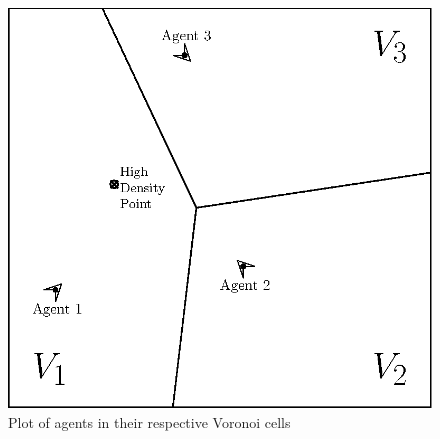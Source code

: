 \begin{figure} [H]
    \centering
    \includegraphics{figs/IPE/voronoiRegions.eps}
    \caption{Plot of agents in their respective Voronoi cells}
    \label{fig:voronoiRegions}
\end{figure}

